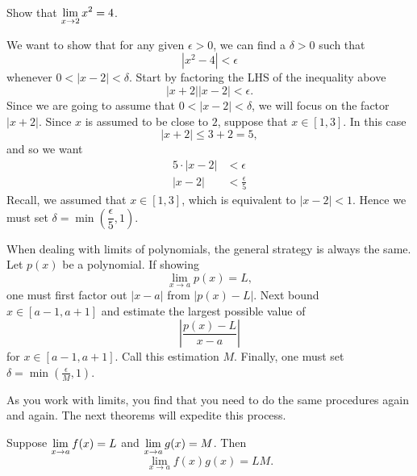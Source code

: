 \begin{example} Show that $\displaystyle \lim_{x\to 2} x^2=4$.

\begin{solution}
We want to show that for any given $\epsilon>0$, we can find a
$\delta>0$ such that
\[
|x^2 -4|<\epsilon
\]
whenever $0<|x - 2|<\delta$. Start by factoring the LHS of the inequality above
\[
|x+2||x-2|<\epsilon.
\]
Since we are going to assume that $0<|x - 2|<\delta$, we will focus on
the factor $|x+2|$. Since $x$ is assumed to be close to $2$, suppose that $x\in[1,3]$. In this case
\[
|x+2| \le 3+2 = 5,
\]
and so we want
\begin{align*}
5\cdot |x-2| &< \epsilon\\
|x-2| &< \frac{\epsilon}{5}
\end{align*}
Recall, we assumed that $x\in[1,3]$, which is equivalent to
$|x-2|<1$. Hence we must set $\delta = \min\left(\dfrac{\epsilon}{5},1\right)$.
\end{solution}
\end{example}

When dealing with limits of polynomials, the general strategy is
always the same. Let $p(x)$ be a polynomial. If showing
\[
\lim_{x\to a} p(x) = L,
\]
one must first factor out $|x-a|$ from $|p(x) - L|$. Next bound $x\in
[a-1,a+1]$ and estimate the largest possible value of
\[
\left|\frac{p(x) -L}{x-a}\right|
\]
for $x\in[a-1,a+1]$. Call this estimation $M$. Finally, one must set
$\delta = \min\left(\frac{\epsilon}{M}, 1\right)$.

As you work with limits, you find that you need to do the same
procedures again and again. The next theorems will expedite this
process.
\begin{theorem} 
Suppose $\displaystyle \lim_{x\to a} f(x)=L$ and $\displaystyle \lim_{x\to a}g(x)=M$. Then
\[
\lim_{x\to a} f(x)g(x) = LM.
\]
\end{theorem}

